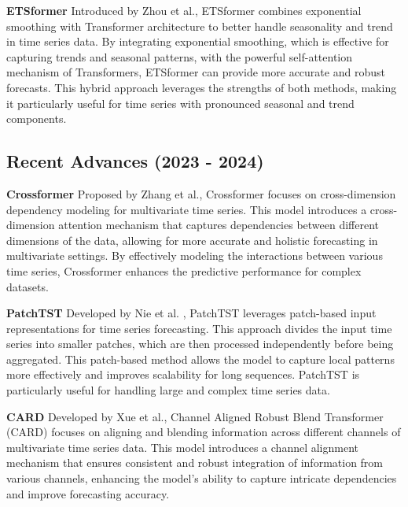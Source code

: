 \noindent\textbf
{ETSformer}
 Introduced by Zhou et al.\cite{woo2022etsformerexponentialsmoothingtransformers}, ETSformer combines exponential smoothing with Transformer architecture to better handle seasonality and trend in time series data. By integrating exponential smoothing, which is effective for capturing trends and seasonal patterns, with the powerful self-attention mechanism of Transformers, ETSformer can provide more accurate and robust forecasts. This hybrid approach leverages the strengths of both methods, making it particularly useful for time series with pronounced seasonal and trend components.
\vspace{10pt}


\subsection{Recent Advances (2023 - 2024)}
\noindent\textbf
{Crossformer}
 Proposed by Zhang et al.\cite{wang2021crossformerversatilevisiontransformer}, Crossformer focuses on cross-dimension dependency modeling for multivariate time series. This model introduces a cross-dimension attention mechanism that captures dependencies between different dimensions of the data, allowing for more accurate and holistic forecasting in multivariate settings. By effectively modeling the interactions between various time series, Crossformer enhances the predictive performance for complex datasets.
\vspace{10pt}


\noindent\textbf
{PatchTST}
 Developed by Nie et al.\cite{nie2023timeseriesworth64} , PatchTST leverages patch-based input representations for time series forecasting. This approach divides the input time series into smaller patches, which are then processed independently before being aggregated. This patch-based method allows the model to capture local patterns more effectively and improves scalability for long sequences. PatchTST is particularly useful for handling large and complex time series data.
\vspace{10pt}


\noindent\textbf
{CARD}
 Developed by Xue et al.\cite{xue2024cardchannelalignedrobust}, Channel Aligned Robust Blend Transformer (CARD) focuses on aligning and blending information across different channels of multivariate time series data. This model introduces a channel alignment mechanism that ensures consistent and robust integration of information from various channels, enhancing the model’s ability to capture intricate dependencies and improve forecasting accuracy.
\vspace{10pt}


